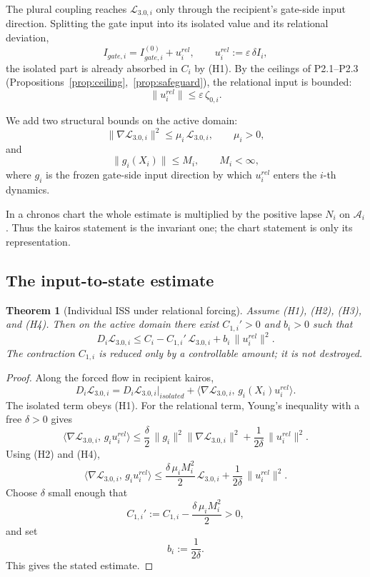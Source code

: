 \documentclass[11pt,a4paper]{article}
\def\mathrm#1{#1}%
\theoremstyle{definition}
\theoremstyle{plain}
\newtheorem{theorem}[definition]{Theorem}
\theoremstyle{remark}
\begin{document}
The plural coupling reaches \(\mathcal L_{3.0,i}\) only through the recipient's
gate-side input direction. Splitting the gate input into its isolated value and its
relational deviation,
\[
I_{\mathrm{gate},i}
=
I_{\mathrm{gate},i}^{(0)}
+
u_i^{\mathrm{rel}},
\qquad
u_i^{\mathrm{rel}}:=\varepsilon\,\delta I_i,
\]
the isolated part is already absorbed in \(C_i\) by (H1). By the ceilings of
P2.1--P2.3 (Propositions~\ref{prop:ceiling},~\ref{prop:safeguard}), the relational
input is bounded:
\[
\lVert u_i^{\mathrm{rel}}\rVert
\le
\varepsilon\,\zeta_{0,i}.
\tag{H3}
\]

We add two structural bounds on the active domain:
\[
\lVert\nabla\mathcal L_{3.0,i}\rVert^2
\le
\mu_i\,\mathcal L_{3.0,i},
\qquad
\mu_i>0,
\tag{H2}
\]
and
\[
\lVert g_i(X_i)\rVert
\le
M_i,
\qquad
M_i<\infty,
\tag{H4}
\]
where \(g_i\) is the frozen gate-side input direction by which
\(u_i^{\mathrm{rel}}\) enters the \(i\)-th dynamics.

In a chronos chart the whole estimate is multiplied by the positive lapse \(N_i\)
on \(\mathcal A_i\). Thus the kairos statement is the invariant one; the chart
statement is only its representation.

\subsection{The input-to-state estimate}

\begin{theorem}[Individual ISS under relational forcing]\label{thm:iss}
Assume \textup{(H1)}, \textup{(H2)}, \textup{(H3)}, and \textup{(H4)}. Then on the
active domain there exist \(C_{1,i}'>0\) and \(b_i>0\) such that
\[
\boxed{\;
D_i\mathcal L_{3.0,i}
\le
C_i-C_{1,i}'\,\mathcal L_{3.0,i}
+
b_i\,\lVert u_i^{\mathrm{rel}}\rVert^2.
\;}
\]
The contraction \(C_{1,i}\) is reduced only by a controllable amount; it is not
destroyed.
\end{theorem}

\begin{proof}
Along the forced flow in recipient kairos,
\[
D_i\mathcal L_{3.0,i}
=
D_i\mathcal L_{3.0,i}\big|_{\mathrm{isolated}}
+
\bigl\langle
\nabla\mathcal L_{3.0,i},\,
g_i(X_i)u_i^{\mathrm{rel}}
\bigr\rangle.
\]
The isolated term obeys (H1). For the relational term, Young's inequality with a
free \(\delta>0\) gives
\[
\bigl\langle
\nabla\mathcal L_{3.0,i},\,
g_i u_i^{\mathrm{rel}}
\bigr\rangle
\le
\frac{\delta}{2}\,\lVert g_i\rVert^2
\lVert\nabla\mathcal L_{3.0,i}\rVert^2
+
\frac{1}{2\delta}\,\lVert u_i^{\mathrm{rel}}\rVert^2.
\]
Using (H2) and (H4),
\[
\bigl\langle
\nabla\mathcal L_{3.0,i},\,
g_i u_i^{\mathrm{rel}}
\bigr\rangle
\le
\frac{\delta\,\mu_iM_i^2}{2}\,\mathcal L_{3.0,i}
+
\frac{1}{2\delta}\,\lVert u_i^{\mathrm{rel}}\rVert^2.
\]
Choose \(\delta\) small enough that
\[
C_{1,i}'
:=
C_{1,i}-\frac{\delta\,\mu_iM_i^2}{2}
>0,
\]
and set
\[
b_i:=\frac{1}{2\delta}.
\]
This gives the stated estimate. \qedhere
\end{proof}
\end{document}
